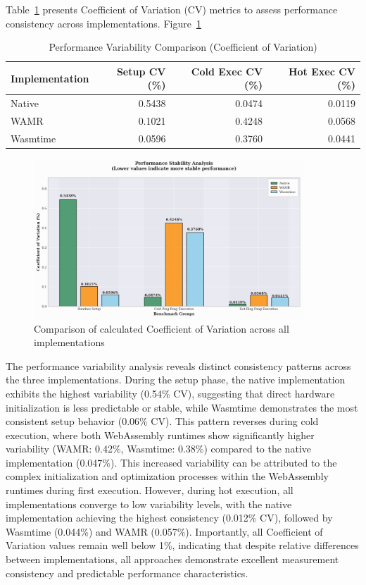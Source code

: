 Table~\ref{tab:variability} presents Coefficient of Variation (CV) metrics to assess performance consistency across implementations. Figure~\ref{fig:variability-comparison}

\begin{table}[htbp]
    \centering
    \caption{Performance Variability Comparison (Coefficient of Variation)}
    \label{tab:variability}
    \begin{tabular}{lrrr}
    \toprule
    \textbf{Implementation} & \textbf{Setup CV (\%)} & \textbf{Cold Exec CV (\%)} & \textbf{Hot Exec CV (\%)} \\
    \midrule
    Native       & 0.5438 & 0.0474 & 0.0119 \\
    WAMR         & 0.1021 & 0.4248 & 0.0568 \\
    Wasmtime     & 0.0596 & 0.3760 & 0.0441 \\
    \bottomrule
    \end{tabular}
\end{table}

\begin{figure}[htbp]
    \centering
    \includegraphics[width=0.9\textwidth]{images/variability-comparison}
    \caption{Comparison of calculated Coefficient of Variation across all implementations}
    \label{fig:variability-comparison}
\end{figure}

The performance variability analysis reveals distinct consistency patterns across the three implementations. During the setup phase, the native implementation exhibits the highest variability (0.54\% CV), suggesting that direct hardware initialization is less predictable or stable, while Wasmtime demonstrates the most consistent setup behavior (0.06\% CV). This pattern reverses during cold execution, where both WebAssembly runtimes show significantly higher variability (WAMR: 0.42\%, Wasmtime: 0.38\%) compared to the native implementation (0.047\%). This increased variability can be attributed to the complex initialization and optimization processes within the WebAssembly runtimes during first execution. However, during hot execution, all implementations converge to low variability levels, with the native implementation achieving the highest consistency (0.012\% CV), followed by Wasmtime (0.044\%) and WAMR (0.057\%). Importantly, all Coefficient of Variation values remain well below 1\%, indicating that despite relative differences between implementations, all approaches demonstrate excellent measurement consistency and predictable performance characteristics.

